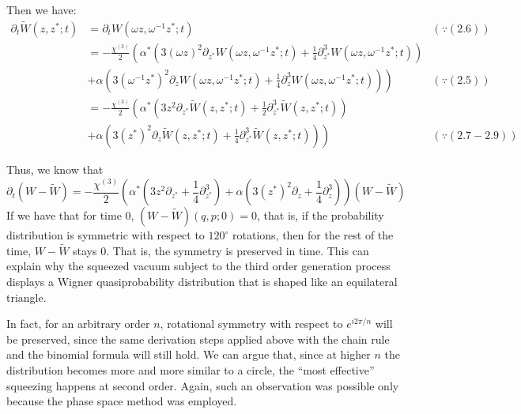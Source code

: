 \documentclass[10pt,a4paper]{report}
\newcommand*{\wigner}{
W(\omega z, \omega^{-1}z^{*};t)}
\begin{document}
Then we have:
\begin{align*}
  \partial_{t}\tilde{W}(z,z^{*};t) & =\partial_{t}\wigner                                                                                                                                      & (\because (2.6))   \\
                                   & =-\frac{\chi^{(3)}}{2}\left( \alpha^{*}\left( 3(\omega z)^{2}\partial_{z^{*}}\wigner+\frac{1}{4}\partial_{z^{*}}^{3}\wigner\right)\right.                                     \\
                                   & \left.+\alpha\left(3(\omega^{-1}z^{*})^{2}\partial_{z}\wigner+\frac{1}{4}\partial_{z}^{3}\wigner\right)\right)                                            & (\because (2.5))    \\
                                   & =-\frac{\chi^{(3)}}{2}\left( \alpha^{*}\left(3z^{2}\partial_{z^{*}}\tilde{W}(z,z^{*};t)+\frac{1}{2}\partial_{z^{*}}^{3}\tilde{W}(z,z^{*};t)\right)\right.                     \\
                                   & \left.+\alpha\left( 3(z^{*})^{2}\partial_{z}\tilde{W}(z,z^{*};t)+\frac{1}{4}\partial_{z^{*}}^{3}\tilde{W}(z,z^{*};t)\right)\right)                        & (\because (2.7-2.9))
\end{align*}

Thus, we know that
\[\partial_{t}(W-\tilde{W})=-\frac{\chi^{(3)}}{2}\left(\alpha^{*}\left(3z^{2}\partial_{z^{*}}+\frac{1}{4}\partial_{z^{*}}^{3}\right)+\alpha\left(3(z^{*})^{2}\partial_{z}+\frac{1}{4}\partial_{z}^{3}\right)\right)(W-\tilde{W})\]
If we have that for time $0$, $(W-\tilde{W})(q,p;0)=0$, that is, if the probability distribution is symmetric with respect to $120^{\circ}$ rotations, then for the rest of the time, $W-\tilde{W}$ stays $0$. That is, the symmetry is preserved in time.
This can explain why the squeezed vacuum subject to the third order generation process displays a Wigner quasiprobability distribution that is shaped like an equilateral triangle.

In fact, for an arbitrary order $n$, rotational symmetry with respect to $e^{i2\pi/n}$ will be preserved, since the same derivation steps applied above with the chain rule and the binomial formula will still hold.
We can argue that, since at higher $n$ the distribution becomes more and more similar to a circle, the ``most effective'' squeezing happens at second order.
Again, such an observation was possible only because the phase space method was employed.
\end{document}
